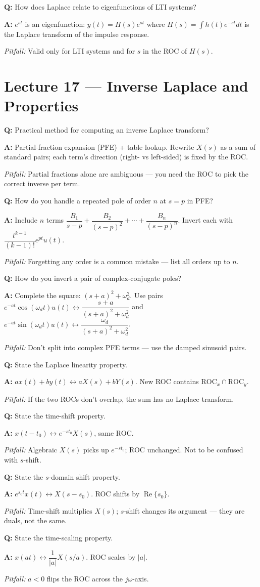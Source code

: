 \documentclass[11pt]{article}
\newcommand{\Q}[1]{\par\medskip\noindent\textbf{Q:} #1}
\newcommand{\A}[1]{\par\noindent\textbf{A:} #1}
\newcommand{\Pit}[1]{\par\noindent\textit{Pitfall:} #1}
\begin{document}
\Q{How does Laplace relate to eigenfunctions of LTI systems?}
\A{$e^{st}$ is an eigenfunction: $y(t) = H(s)e^{st}$ where $H(s)=\int h(t)e^{-st}dt$ is the Laplace transform of the impulse response.}
\Pit{Valid only for LTI systems and for $s$ in the ROC of $H(s)$.}

\section{Lecture 17 --- Inverse Laplace and Properties}

\Q{Practical method for computing an inverse Laplace transform?}
\A{Partial-fraction expansion (PFE) + table lookup. Rewrite $X(s)$ as a sum of standard pairs; each term's direction (right- vs left-sided) is fixed by the ROC.}
\Pit{Partial fractions alone are ambiguous --- you need the ROC to pick the correct inverse per term.}

\Q{How do you handle a repeated pole of order $n$ at $s = p$ in PFE?}
\A{Include $n$ terms $\dfrac{B_1}{s-p} + \dfrac{B_2}{(s-p)^2} + \cdots + \dfrac{B_n}{(s-p)^n}$. Invert each with $\dfrac{t^{k-1}}{(k-1)!}e^{pt}u(t)$.}
\Pit{Forgetting any order is a common mistake --- list all orders up to $n$.}

\Q{How do you invert a pair of complex-conjugate poles?}
\A{Complete the square: $(s+a)^2 + \omega_d^2$. Use pairs $e^{-at}\cos(\omega_d t)u(t) \leftrightarrow \dfrac{s+a}{(s+a)^2+\omega_d^2}$ and $e^{-at}\sin(\omega_d t)u(t) \leftrightarrow \dfrac{\omega_d}{(s+a)^2+\omega_d^2}$.}
\Pit{Don't split into complex PFE terms --- use the damped sinusoid pairs.}

\Q{State the Laplace linearity property.}
\A{$ax(t)+by(t) \leftrightarrow aX(s)+bY(s)$. New ROC contains $\text{ROC}_x \cap \text{ROC}_y$.}
\Pit{If the two ROCs don't overlap, the sum has no Laplace transform.}

\Q{State the time-shift property.}
\A{$x(t-t_0) \leftrightarrow e^{-st_0}X(s)$, same ROC.}
\Pit{Algebraic $X(s)$ picks up $e^{-st_0}$; ROC unchanged. Not to be confused with $s$-shift.}

\Q{State the $s$-domain shift property.}
\A{$e^{s_0 t}x(t) \leftrightarrow X(s-s_0)$. ROC shifts by $\operatorname{Re}\{s_0\}$.}
\Pit{Time-shift multiplies $X(s)$; $s$-shift changes its argument --- they are duals, not the same.}

\Q{State the time-scaling property.}
\A{$x(at) \leftrightarrow \dfrac{1}{|a|}X(s/a)$. ROC scales by $|a|$.}
\Pit{$a<0$ flips the ROC across the $j\omega$-axis.}
\end{document}
